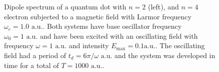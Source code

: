 \begin{figure}[!h]
    \centering
    \caption{Dipole spectrum of a quantum dot with $n=2$ (left), and $n=4$ electron 
    subjected to a magnetic field with Larmor frequency $\omega_c=1.0 \text{ a.u.}$.
    Both systems have base oscillator frequency $\omega_0=1 \text{ a.u.}$ and 
    have been excited with an oscillating field with frequency $\omega = 1 \text{ a.u.}$
    and intensity $E_\text{max} = 0.1 \text{a.u.}$. The oscillating field had a period of 
    $t_d = 6\pi/\omega \text{ a.u.}$ and the system was developed in time for a total 
    of $T = 1000 \text{ a.u.}$.}
    \label{fig:b_omc100}
\end{figure}

\vfill
\pagebreak

\clearemptydoublepage